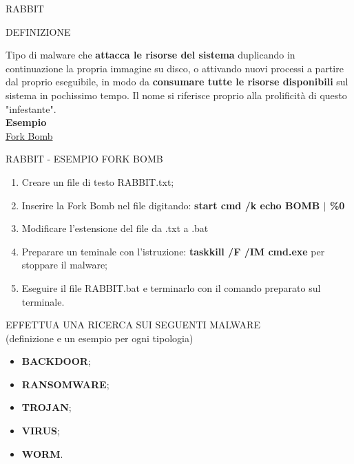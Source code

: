 \documentclass[aspectratio=1610]{beamer}
\begin{document}
\begin{frame}{RABBIT}
    \begin{alertblock}{DEFINIZIONE}
        \begin{minipage}{0.98\linewidth}
            \justifying
            Tipo di malware che \textbf{attacca le risorse del sistema} duplicando in continuazione la propria 
            immagine su disco, o attivando nuovi processi a partire dal proprio eseguibile, 
            in modo da \textbf{consumare tutte le risorse disponibili} sul sistema in pochissimo tempo. 
            Il nome si riferisce proprio alla prolificità di questo "infestante".\\
            \bigskip
            \tiny{\textbf{Esempio}}\\
            \tiny{\href{https://it.wikipedia.org/wiki/Fork_bomb}{Fork Bomb}}
            
        \end{minipage}
    \end{alertblock}
\end{frame}

\begin{frame}{RABBIT - ESEMPIO FORK BOMB}
    \begin{enumerate}
        \item Creare un file di testo RABBIT.txt;
        \pause
        \item Inserire la Fork Bomb nel file digitando: \textbf{start cmd /k echo BOMB \textbf{$\mid$} \%0}
        \pause
        \item Modificare l’estensione del ﬁle da .txt a .bat
        \pause
        \item Preparare un teminale con l'istruzione: \textbf{taskkill /F /IM cmd.exe} per stoppare il malware;
        \pause
        \item Eseguire il file RABBIT.bat e terminarlo con il comando preparato sul terminale.
    \end{enumerate}                        
\end{frame}

\begin{frame}{EFFETTUA UNA RICERCA SUI SEGUENTI MALWARE\\(definizione e un esempio per ogni tipologia)}
    \begin{itemize}
        \item \textbf{BACKDOOR};
        \item \textbf{RANSOMWARE};
        \item \textbf{TROJAN};
        \item \textbf{VIRUS};
        \item \textbf{WORM}.
    \end{itemize}                        
\end{frame}
\end{document}
